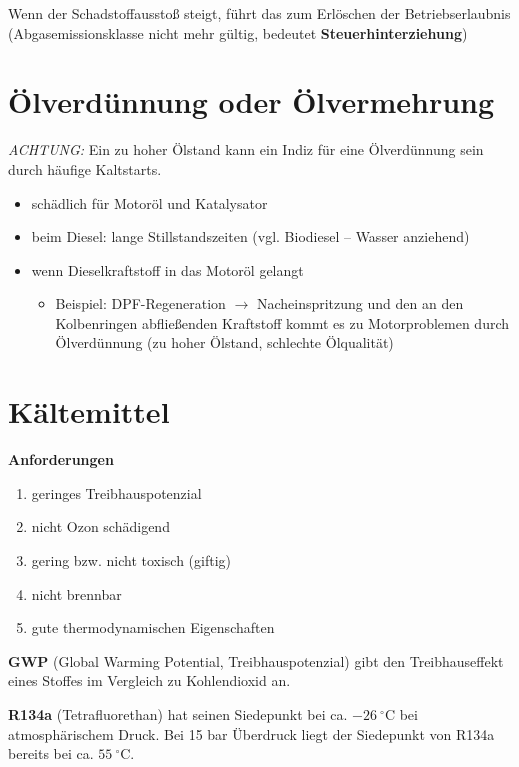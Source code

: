 Wenn der Schadstoffausstoß steigt, führt das zum Erlöschen der
Betriebserlaubnis (Abgasemissionsklasse nicht mehr gültig, bedeutet
\textbf{Steuerhinterziehung})

\section{Ölverdünnung oder
Ölvermehrung}\label{oelverduennung-oder-oelvermehrung}

\emph{ACHTUNG:} Ein zu hoher Ölstand kann ein Indiz für eine
Ölverdünnung sein durch häufige Kaltstarts.

\begin{itemize}
\item
  schädlich für Motoröl und Katalysator
\item
  beim Diesel: lange Stillstandszeiten (vgl. Biodiesel -- Wasser
  anziehend)
\item
  wenn Dieselkraftstoff in das Motoröl gelangt

  \begin{itemize}
  \item
    Beispiel: DPF-Regeneration $\to$ Nacheinspritzung und den an den
    Kolbenringen abfließenden Kraftstoff kommt es zu Motorproblemen
    durch Ölverdünnung (zu hoher Ölstand, schlechte Ölqualität)
  \end{itemize}
\end{itemize}

\section{Kältemittel}\label{kaeltemittel}

\textbf{Anforderungen}

\begin{enumerate}
\item
  geringes Treibhauspotenzial
\item
  nicht Ozon schädigend
\item
  gering bzw. nicht toxisch (giftig)
\item
  nicht brennbar
\item
  gute thermodynamischen Eigenschaften
\end{enumerate}

\textbf{GWP} (Global Warming Potential, Treibhauspotenzial) gibt den
Treibhauseffekt eines Stoffes im Vergleich zu Kohlendioxid an.

\textbf{R134a} (Tetrafluorethan) hat seinen Siedepunkt bei ca.
$-26~^\circ\text{C}$ bei atmosphärischem Druck. Bei 15 bar Überdruck
liegt der Siedepunkt von R134a bereits bei ca. $55~^\circ\text{C}$.

